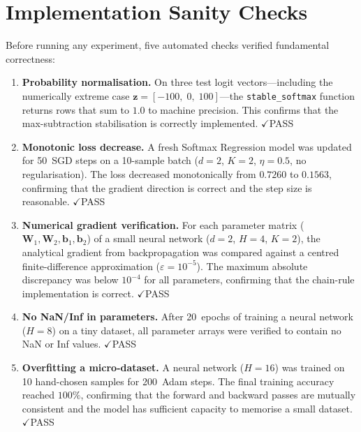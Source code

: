 \documentclass[11pt]{article}
\newcommand{\bz}{\mathbf{z}}
\newcommand{\bW}{\mathbf{W}}
\newcommand{\bb}{\mathbf{b}}
\begin{document}
\section{Implementation Sanity Checks}
\label{sec:sanity}

Before running any experiment, five automated checks verified fundamental correctness:

\begin{enumerate}[label=\textbf{Check~\arabic*.},leftmargin=3em,itemsep=0.3em]
  \item \textbf{Probability normalisation.}
        On three test logit vectors---including the numerically extreme case
        $\bz=[-100,\;0,\;100]$---the \texttt{stable\_softmax} function returns rows that
        sum to $1.0$ to machine precision.  This confirms that the max-subtraction
        stabilisation is correctly implemented.
        \hfill$\checkmark$\;PASS

  \item \textbf{Monotonic loss decrease.}
        A fresh Softmax Regression model was updated for 50~SGD steps on a 10-sample
        batch ($d{=}2$, $K{=}2$, $\eta{=}0.5$, no regularisation).  The loss decreased
        monotonically from $0.7260$ to $0.1563$, confirming that the gradient direction
        is correct and the step size is reasonable.
        \hfill$\checkmark$\;PASS

  \item \textbf{Numerical gradient verification.}
        For each parameter matrix ($\bW_1, \bW_2, \bb_1, \bb_2$) of a small neural
        network ($d{=}2$, $H{=}4$, $K{=}2$), the analytical gradient from backpropagation
        was compared against a centred finite-difference approximation
        ($\varepsilon{=}10^{-5}$).  The maximum absolute discrepancy was below $10^{-4}$
        for all parameters, confirming that the chain-rule implementation is correct.
        \hfill$\checkmark$\;PASS

  \item \textbf{No NaN/Inf in parameters.}
        After 20~epochs of training a neural network ($H{=}8$) on a tiny dataset, all
        parameter arrays were verified to contain no NaN or Inf values.
        \hfill$\checkmark$\;PASS

  \item \textbf{Overfitting a micro-dataset.}
        A neural network ($H{=}16$) was trained on 10 hand-chosen samples for 200~Adam
        steps.  The final training accuracy reached $100\%$, confirming that the forward
        and backward passes are mutually consistent and the model has sufficient capacity
        to memorise a small dataset.
        \hfill$\checkmark$\;PASS
\end{enumerate}
\end{document}
